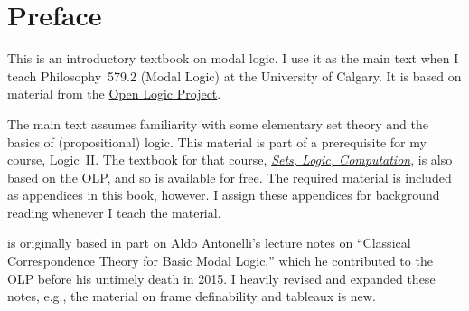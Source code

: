 
\chapter{Preface}

This is an introductory textbook on modal logic. I use it as the main
text when I teach Philosophy~579.2 (Modal Logic) at the University of
Calgary. It is based on material from the
\href{https://openlogicproject.org}{Open Logic Project}.

The main text assumes familiarity with some elementary set theory and
the basics of (propositional) logic. This material is part of a
prerequisite for my course, Logic~II. The textbook for that course,
\href{https://slc.openlogicproject.org}{\emph{Sets, Logic,
Computation}}, is also based on the OLP, and so is available for free.
The required material is included as appendices in this book,
however. I assign these appendices for background reading whenever I
teach the material.

 is originally based in part on Aldo Antonelli's
lecture notes on ``Classical Correspondence Theory for Basic Modal
Logic,'' which he contributed to the OLP before his untimely death in
2015. I heavily revised and expanded these notes, e.g., the material
on frame definability and tableaux is new.